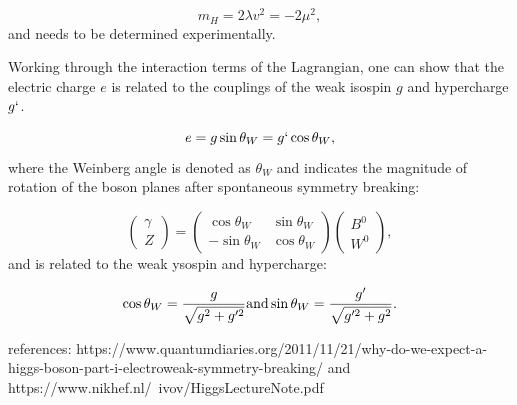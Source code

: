 \begin{equation}
m_H = 2\lambda v^2 = - 2\mu^2,
\end{equation}
and needs to be determined experimentally.

Working through the interaction terms of the Lagrangian, one can show that the electric charge $e$  is related to the couplings of the weak isospin $g$ and hypercharge $g`$.

\begin{equation}
e = g \sin \theta_{W} = g` \cos \theta_W,
\end{equation} 
where the Weinberg angle is denoted as $\theta_W$ and indicates the magnitude of rotation of the boson planes after spontaneous symmetry breaking:

\begin{equation}
\begin{pmatrix} \gamma \\ Z \end{pmatrix} = 
\begin{pmatrix} \cos{\theta_W} & \sin{\theta_W} \\ -\sin{\theta_W} & \cos{\theta_W} \end{pmatrix} \begin{pmatrix} B^0 \\ W^0 \end{pmatrix},
\end{equation}
and is related to the weak ysospin and hypercharge:

\begin{equation}
\cos \theta_W = \frac{g}{\sqrt{g^2 + g'^2}} \textrm{\\ and \\} \sin \theta_W = \frac{g'}{\sqrt{g'^2 + g^2}}.
\end{equation}

references: https://www.quantumdiaries.org/2011/11/21/why-do-we-expect-a-higgs-boson-part-i-electroweak-symmetry-breaking/
and https://www.nikhef.nl/~ivov/HiggsLectureNote.pdf



